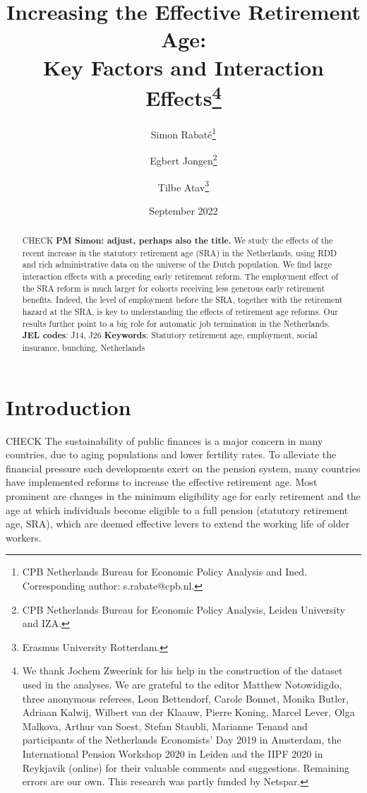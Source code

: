 \documentclass[12pt,a4paper]{article}
\title{Increasing the Effective Retirement Age:\\ Key Factors and Interaction Effects\thanks{We thank Jochem Zweerink for his help in the construction of the dataset used in the analyses. We are grateful to the editor Matthew Notowidigdo, three anonymous referees, Leon Bettendorf, Carole Bonnet, Monika Butler, Adriaan Kalwij, Wilbert van der Klaauw, Pierre Koning, Marcel Lever, Olga Malkova, Arthur van Soest, Stefan Staubli, Marianne Tenand and participants of the Netherlands Economists' Day 2019 in Amsterdam, the International Pension Workshop 2020 in Leiden and the IIPF 2020 in Reykjavik (online) for their valuable comments and suggestions. Remaining errors are our own. This research was partly funded by Netspar.}
}
\author{Simon Rabaté\thanks{CPB Netherlands Bureau for Economic Policy Analysis and Ined. Corresponding author: s.rabate@cpb.nl.  } \and Egbert Jongen\thanks{CPB Netherlands Bureau for Economic Policy Analysis, Leiden University and IZA.} \and Tilbe Atav\thanks{Erasmus University Rotterdam.} }
\date{September 2022}
\begin{document}
	
\maketitle
\thispagestyle{empty}

\begin{abstract}
	
\noindent CHECK \textbf{PM Simon: adjust, perhaps also the title.} We study the effects of the recent increase in the statutory retirement age (SRA) in the Netherlands, using RDD and rich administrative data on the universe of the Dutch population. We find large interaction effects with a preceding early retirement reform. The employment effect of the SRA reform is much larger for cohorts receiving less generous early retirement benefits. Indeed, the level of employment before the SRA, together with the retirement hazard at the SRA, is key to understanding the effects of retirement age reforms. Our results further point to a big role for automatic job termination in the Netherlands. 
\newline
\\
\textbf{JEL codes}:  J14, J26 \newline
\textbf{Keywords}: Statutory retirement age, employment, social insurance, bunching, Netherlands \newline
\end{abstract}

\clearpage
{}

\newpage

\section{Introduction}

CHECK The sustainability of public finances is a major concern in many countries, due to aging populations and lower fertility rates. %
To alleviate the financial pressure such developments exert on the pension system, many countries have implemented reforms to increase the effective retirement age. Most prominent are changes in the minimum eligibility age for early retirement and the age at which individuals become eligible to a full pension (statutory retirement age, SRA),
which are deemed effective levers to extend the working life of older workers. 
\end{document}
